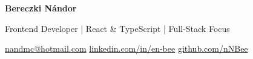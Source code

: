 \begin{center}

{\fontsize{26}{30}\selectfont\bfseries\color{heading} Bereczki Nándor}

\vspace{0.25em}

{\fontsize{13}{16}\selectfont\color{subtle} Frontend Developer | React \& TypeScript | Full-Stack Focus}

\vspace{0.8em}

\small
\href{mailto:nandmc@hotmail.com}{nandmc@hotmail.com}
\contactsep
\href{https://www.linkedin.com/in/en-bee}{linkedin.com/in/en-bee}
\contactsep
\href{https://github.com/nNBee}{github.com/nNBee}

\end{center}
